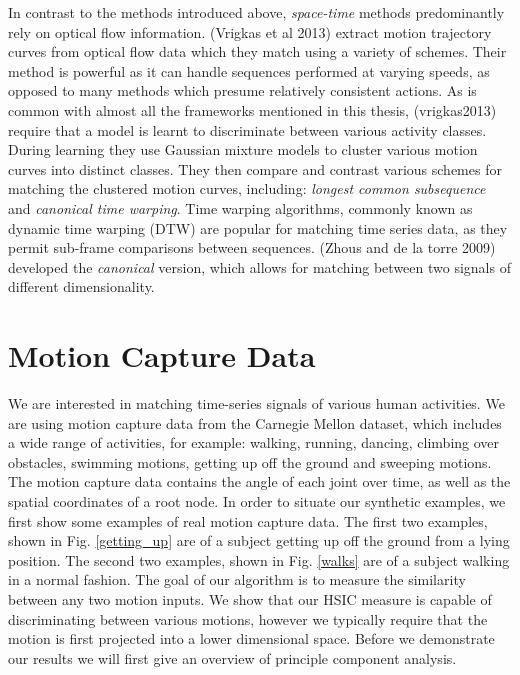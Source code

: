 In contrast to the methods introduced above, \textit{space-time} methods predominantly rely on optical flow information. (Vrigkas et al 2013) extract motion trajectory curves from optical flow data which they match using a variety of schemes. Their method is powerful as it can handle sequences performed at varying speeds, as opposed to many methods which presume relatively consistent actions. As is common with almost all the frameworks mentioned in this thesis, (vrigkas2013) require that a model is learnt to discriminate between various activity classes. During learning they use Gaussian mixture models to cluster various motion curves into distinct classes. They then compare and contrast various schemes for matching the clustered motion curves, including: \textit{longest common subsequence} and \textit{canonical time warping}. Time warping algorithms, commonly known as dynamic time warping (DTW) are popular for matching time series data, as they permit sub-frame comparisons between sequences. (Zhous and de la torre 2009) developed the \textit{canonical} version, which allows for matching between two signals of different dimensionality. 

\section{Motion Capture Data}

We are interested in matching time-series signals of various human activities. We are using motion capture data from the Carnegie Mellon dataset, which includes a wide range of activities, for example: walking, running, dancing, climbing over obstacles, swimming motions, getting up off the ground and sweeping motions. The motion capture data contains the angle of each joint over time, as well as the spatial coordinates of a root node. In order to situate our synthetic examples, we first show some examples of real motion capture data. The first two examples, shown in Fig. \ref{getting_up} are of a subject getting up off the ground from a lying position. The second two examples, shown in Fig. \ref{walks} are of a subject walking in a normal fashion. The goal of our algorithm is to measure the similarity between any two motion inputs. We show that our HSIC measure is capable of discriminating between various motions, however we typically require that the motion is first projected into a lower dimensional space. Before we demonstrate our results we will first give an overview of principle component analysis.\\

